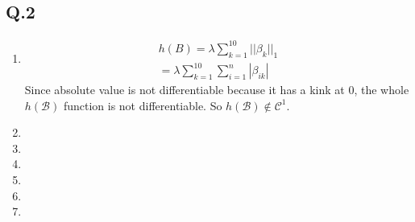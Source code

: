 \documentclass[12pt,twoside]{article}
\begin{document}
\subsection{Q.2}
\begin{enumerate}[1)]
\item
\begin{align}
h(B) = \lambda\sum_{k=1}^{10}||\beta_k||_1\\
= \lambda\sum_{k=1}^{10}\sum_{i=1}^{n}|\beta_{ik}|
\end{align}
Since absolute value is not differentiable because it has a kink at 0, the whole $h(\mathcal{B})$ function is not differentiable. So $h(\mathcal{B}) \not\in \mathcal{C}^1$.
\item



\item

\item

\item

\item

\item

\end{enumerate}
\end{document}
